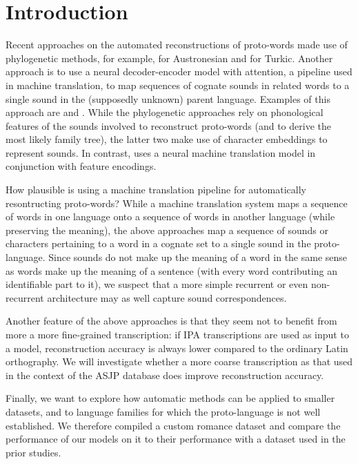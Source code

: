 \section{Introduction}

Recent approaches on the automated reconstructions of proto-words made use of phylogenetic methods, for example, \citet{bouchard-Cote_et_al:2013} for Austronesian
and \citet{hruschka_detecting_2015} for Turkic. Another approach is to use a neural decoder-encoder model with attention, a pipeline used in machine translation, to map sequences of cognate sounds
in related words to a single sound in the (supposedly unknown) parent language. Examples of this approach are \citet{ciobanu-dinu-2018-ab} and \citet{meloni2019ab}.
While the phylogenetic approaches rely on phonological features of the sounds involved to reconstruct proto-words (and to derive the most likely family tree), 
the latter two make use of character embeddings to represent sounds. In contrast, \citet{dekker_msc_2018} uses a neural machine translation model in conjunction with feature encodings. 

How plausible is using a machine translation pipeline for automatically resontructing proto-words? While a machine translation system maps a sequence of words in one language onto a sequence of words in another language (while preserving the meaning), the above approaches map a sequence of sounds or characters pertaining to a word in a cognate set to a single sound in the proto-language. Since sounds do not make up the meaning of a word in the same sense as words make up the meaning of a sentence (with every word contributing an identifiable part to it), we suspect that a more simple recurrent or even non-recurrent architecture may as well capture sound correspondences. 

Another feature of the above approaches is that they seem not to benefit from more a more fine-grained transcription: if IPA transcriptions are used as input to a model, reconstruction accuracy is always lower compared to the ordinary Latin orthography.
We will investigate whether a more coarse transcription as that used in the context of the ASJP database \cite{brown_automated_2008} does improve reconstruction accuracy.

Finally, we want to explore how automatic methods can be applied to smaller datasets, and to language families for which the proto-language is not well established. We therefore compiled a custom romance dataset and compare the performance of our models on it to their performance with a dataset used in the prior studies.

